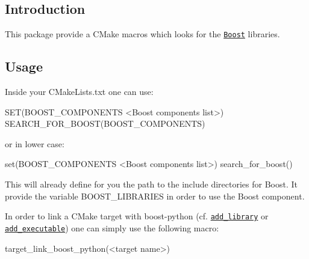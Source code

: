 \subsection*{Introduction}

This package provide a C\+Make macros which looks for the \href{https://www.boost.org/doc/libs/}{\tt Boost} libraries.

\subsection*{Usage}

Inside your {\ttfamily C\+Make\+Lists.\+txt} one can use\+: \begin{DoxyVerb}SET(BOOST_COMPONENTS <Boost components list>)
SEARCH_FOR_BOOST(BOOST_COMPONENTS)
\end{DoxyVerb}


or in lower case\+: \begin{DoxyVerb}set(BOOST_COMPONENTS <Boost components list>)
search_for_boost()
\end{DoxyVerb}


This will already define for you the path to the include directories for Boost. It provide the variable {\ttfamily B\+O\+O\+S\+T\+\_\+\+L\+I\+B\+R\+A\+R\+I\+ES} in order to use the Boost component.

In order to link a C\+Make target with boost-\/python (cf. \href{https://cmake.org/cmake/help/v3.17/command/add_library.html?highlight=add_library}{\tt add\+\_\+library} or \href{https://cmake.org/cmake/help/v3.17/command/add_executable.html?highlight=add_executable}{\tt add\+\_\+executable}) one can simply use the following macro\+:

\begin{DoxyVerb}target_link_boost_python(<target name>) \end{DoxyVerb}
 